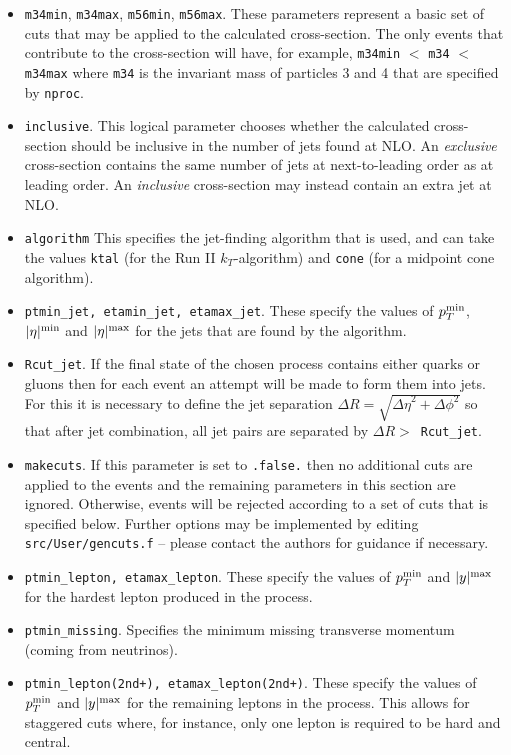 \documentclass[12pt]{article}
\begin{document}
\begin{itemize}
\begin{center}
\{blank line\} \\
{\tt [Jet definition and event cuts] }
\end{center}

\item {\tt m34min}, {\tt m34max}, {\tt m56min}, {\tt m56max}.
These parameters represent a basic set of cuts that may be applied
to the calculated cross-section. The only events that contribute to
the cross-section will have, for example,
{\tt m34min} $<$ {\tt m34} $<$ {\tt m34max} where {\tt m34} is the
invariant mass of particles 3 and 4 that are specified by {\tt nproc}.

\item {\tt inclusive}.  This logical parameter chooses whether the
calculated cross-section should be inclusive in the number of jets
found at NLO. An {\em exclusive}
cross-section contains the same number of jets at next-to-leading
order as at leading order. An {\em inclusive} cross-section may
instead contain an extra jet at NLO.

\item {\tt algorithm} This specifies the jet-finding algorithm that
is used, and can take the values
{\tt ktal} (for the Run II $k_T$-algorithm) and {\tt cone} (for
a midpoint cone algorithm).

\item {\tt ptmin\_jet, etamin\_jet, etamax\_jet}. These specify the values
of $p_T^{\rm min}$, $|\eta|^{\rm min}$ and $|\eta|^{\rm max}$ for the
jets that are found by the algorithm. 

\item {\tt Rcut\_jet}. If the final state of the chosen process contains
either quarks or gluons then for each event an attempt will be made
to form them into jets. For this it is necessary to define the
jet separation $\Delta R=\sqrt{{\Delta \eta}^2 + {\Delta \phi}^2}$
so that after jet combination, all jet pairs are separated by
$\Delta R >$~{\tt Rcut\_jet}.

\item {\tt makecuts}. If this parameter is set to {\tt .false.} then
no additional cuts are applied to the events and the remaining
parameters in this section are ignored. Otherwise, events will
be rejected according to a set of cuts that is specified below.
Further options may be implemented by editing {\tt src/User/gencuts.f}
-- please contact the authors for guidance if necessary.

\item {\tt ptmin\_lepton, etamax\_lepton}. These specify the values
of $p_T^{\rm min}$ and $|y|^{\rm max}$ for the hardest lepton produced
in the process.
\item {\tt ptmin\_missing}. Specifies the minimum missing transverse
momentum (coming from neutrinos).
\item {\tt ptmin\_lepton(2nd+), etamax\_lepton(2nd+)}. These specify
the values of $p_T^{\rm min}$ and $|y|^{\rm max}$ for the remaining
leptons in the process. This allows for staggered cuts where, for
instance, only one lepton is required to be hard and central.


\end{itemize}
\end{document}
